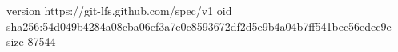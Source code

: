 version https://git-lfs.github.com/spec/v1
oid sha256:54d049b4284a08cba06ef3a7e0c8593672df2d5e9b4a04b7ff541bec56edec9e
size 87544
